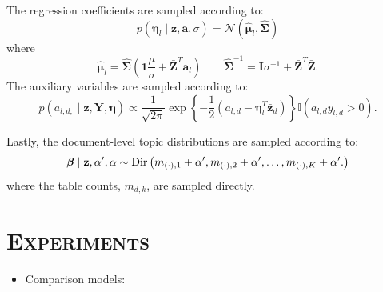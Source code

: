 \documentclass[portrait]{sciposter}
\begin{document}
\begin{multicols}{3}
The regression coefficients are sampled according to:
\begin{equation*}
p(\boldsymbol\eta_{l}\mid\mathbf{z},\mathbf{a},\sigma) = \mathcal{N}(\hat{\boldsymbol\mu}_{l},\hat{\mathbf{\Sigma}})\label{eqn:regression_param_conditional}
\end{equation*}
where
\begin{equation*}
\hat{\boldsymbol\mu}_{l}  =  \hat{\mathbf{\Sigma}}\left(\mathbf{1}\frac{\mu}{\sigma}+\bar{\mathbf{Z}}^{T}\mathbf{a}_{l}\right) \qquad \hat{\mathbf{\Sigma}}^{-1}  =  \mathbf{I}\sigma^{-1}+\bar{\mathbf{Z}}^{T}\bar{\mathbf{Z}}
.\end{equation*}
The auxiliary variables are sampled according to:
\begin{equation*}
p\left(a_{l,d,}\mid\mathbf{z},\mathbf{Y},\mathbf{\boldsymbol\eta}\right)\propto\frac{1}{\sqrt{2\pi}}\exp\left\{ -\frac{1}{2}\left(a_{l,d}-\boldsymbol\eta_{l}^{T}\mathbf{\bar{z}}_{d}\right)\right\} \mathbb{I}\left(a_{l,d}y_{l,d}>0\right).\label{eqn:a_l_d}\end{equation*}

Lastly, the document-level topic distributions are sampled according to:
\begin{equation*}
\boldsymbol\beta\mid\mathbf{z},\alpha^{\prime},\alpha\sim{\rm Dir}\left(m_{\left(\cdot\right),1}+\alpha^{\prime},m_{\left(\cdot\right),2}+\alpha^{\prime},\ldots,m_{\left(\cdot\right),K}+\alpha^{\prime}.\right)\end{equation*}
where the table counts, $m_{d,k}$, are sampled directly.



\section{\textsc{Experiments}}

\begin{itemize}
\item Comparison models:
\begin{itemize}


\end{itemize}
\end{itemize}
\end{multicols}
\end{document}
